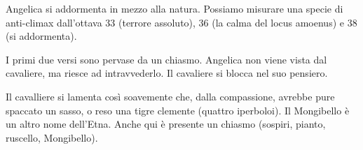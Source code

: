 \documentclass[a4paper]{article}
\begin{document}
Angelica si addormenta in mezzo alla natura.
Possiamo misurare una specie di anti-climax dall'ottava 33 (terrore assoluto),
36 (la calma del locus amoenus) e 38 (si addormenta).

\begin{center} %
\begin{minipage}{0.5\textwidth}
\centering
{}
\end{minipage}
\end{center}

I primi due versi sono pervase da un chiasmo.
Angelica non viene vista dal cavaliere, ma riesce ad intravvederlo.
Il cavaliere si blocca nel suo pensiero.

\begin{center} %
\begin{minipage}{0.5\textwidth}
\centering
{}
\end{minipage}
\end{center}

Il cavalliere si lamenta così soavemente che, dalla compassione, avrebbe
pure spaccato un sasso, o reso una tigre clemente (quattro iperboloi).
Il Mongibello è un altro nome dell'Etna.
Anche qui è presente un chiasmo (sospiri, pianto, ruscello, Mongibello).
\end{document}
